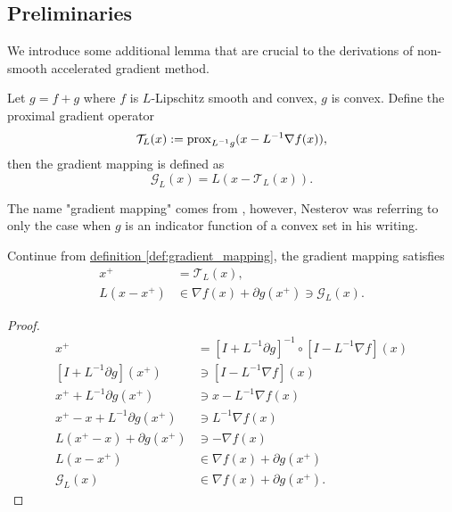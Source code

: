 \documentclass[12pt]{article}
\begin{document}
    
    
    \subsection{Preliminaries}
        We introduce some additional lemma that are crucial to the derivations of non-smooth accelerated gradient method. 
        \begin{definition}
            \label{def:gradient_mapping}
            Let $g = f + g$ where $f$ is $L$-Lipschitz smooth and convex, $g$ is convex. 
            Define the proximal gradient operator
            $$
                \mathcal T_L(x) := \operatorname{prox}_{L^{-1}g}(x - L^{-1}\nabla f(x)),
            $$
            then the gradient mapping is defined as
            $$
                \mathcal G_L(x) = L(x - \mathcal T_L(x)). 
            $$
        \end{definition}
        \begin{remark}
            The name "gradient mapping" comes from \cite[(2.2.54)]{nesterov_lectures_2018}, however, Nesterov was referring to only the case when $g$ is an indicator function of a convex set in his writing. 
        \end{remark}

        \begin{lemma}
            \label{lemma:grad_map_lemma_first}
            Continue from 
            \hyperref[def:gradient_mapping]{definition \ref*{def:gradient_mapping}}, 
            the gradient mapping satisfies
            \begin{align*}
                x^+ &= \mathcal T_L(x), 
                \\
                L(x - x^+) &\in  \nabla f(x) + \partial g(x^+) \ni \mathcal G_L(x). 
            \end{align*}
        \end{lemma}
        \begin{proof}
            \begin{align*}
                x^+ &= [I + L^{-1}\partial g]^{-1}\circ [I - L^{-1}\nabla f](x)
                \\
                [I + L^{-1}\partial g](x^+) &\ni [I - L^{-1}\nabla f](x)
                \\
                x^+ + L^{-1}\partial g(x^+) &\ni x - L^{-1}\nabla f(x)
                \\
                x^+ - x + L^{-1}\partial g(x^+) &\ni L^{-1}\nabla f(x)
                \\
                L(x^+ - x) + \partial g(x^+) &\ni - \nabla f(x)
                \\
                L(x - x^+) &\in \nabla f(x) + \partial g(x^+)
                \\
                \mathcal G_L(x) &\in \nabla f(x) + \partial g(x^+). 
            \end{align*}
        \end{proof}
\end{document}
